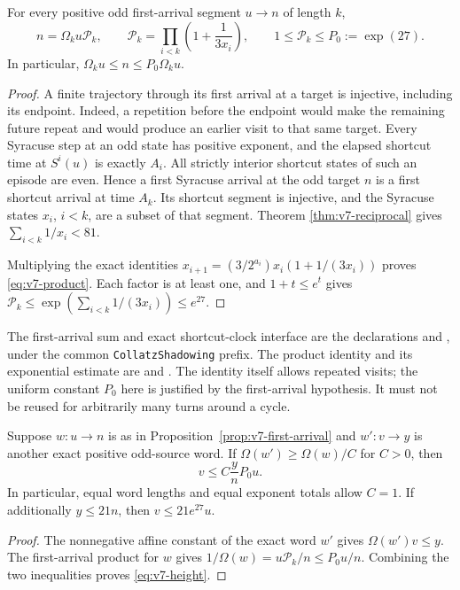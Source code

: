 \begin{proposition}\label{prop:v7-first-arrival}
For every positive odd first-arrival segment $u\to n$ of length $k$,
\begin{equation}\label{eq:v7-product}
 n=\Omega_k u \mathcal P_k,
 \qquad
 \mathcal P_k=\prod_{i<k}\left(1+\frac1{3x_i}\right),
 \qquad 1\le \mathcal P_k\le P_0:=\exp(27).
\end{equation}
In particular, $\Omega_k u\le n\le P_0\Omega_k u$.
\end{proposition}
\begin{proof}
A finite trajectory through its first arrival at a target is injective,
including its endpoint. Indeed, a repetition before the endpoint would
make the remaining future repeat and would produce an earlier visit to
that same target. Every Syracuse step at an odd state has positive
exponent, and the elapsed shortcut time at $S^i(u)$ is exactly $A_i$.
All strictly interior shortcut states of such an episode are even.
Hence a first Syracuse arrival at the odd target $n$ is a first shortcut
arrival at time $A_k$. Its shortcut segment is injective, and the
Syracuse states $x_i$, $i<k$, are a subset of that segment. Theorem
\ref{thm:v7-reciprocal} gives $\sum_{i<k}1/x_i<81$.

Multiplying the exact identities
$x_{i+1}=(3/2^{a_i})x_i(1+1/(3x_i))$ proves
\eqref{eq:v7-product}. Each factor is at least one, and
$1+t\le e^t$ gives
$\mathcal P_k\le\exp(\sum_{i<k}1/(3x_i))\le e^{27}$.
\end{proof}

The first-arrival sum and exact shortcut-clock interface are the
declarations
and , under the common
\texttt{CollatzShadowing} prefix. The product identity and its exponential
estimate are
 and
.
The identity itself allows repeated visits; the uniform constant $P_0$
here is justified by the first-arrival hypothesis. It must not be
reused for arbitrarily many turns around a cycle.

\begin{corollary}
\label{cor:v7-height}
Suppose $w:u\to n$ is as in Proposition~\ref{prop:v7-first-arrival}
and $w':v\to y$ is another exact positive odd-source word. If
$\Omega(w')\ge\Omega(w)/C$ for $C>0$, then
\begin{equation}\label{eq:v7-height}
 v\le C\frac{y}{n}P_0u.
\end{equation}
In particular, equal word lengths and equal exponent totals allow $C=1$.
If additionally $y\le21n$, then $v\le21e^{27}u$.
\end{corollary}
\begin{proof}
The nonnegative affine constant of the exact word $w'$ gives
$\Omega(w')v\le y$. The first-arrival product for $w$ gives
$1/\Omega(w)=u\mathcal P_k/n\le P_0u/n$. Combining the two inequalities proves
\eqref{eq:v7-height}.
\end{proof}

